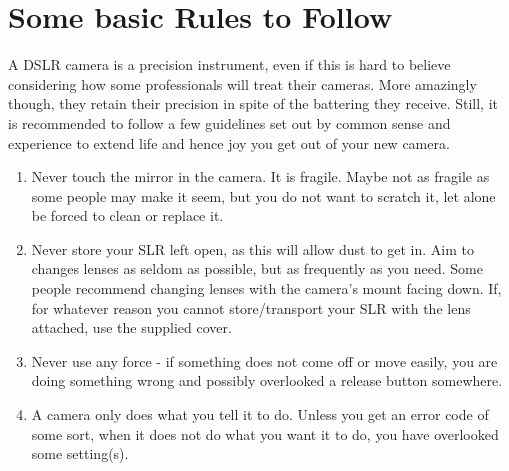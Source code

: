 \section{Some basic Rules to Follow}

A \gls{DSLR} camera is a precision instrument, even if this is hard to believe considering how some professionals will treat their cameras. More amazingly though, they retain their precision in spite of the battering they receive. Still, it is recommended to follow a few guidelines set out by common sense and experience to extend life and hence joy you get out of your new camera.

\begin{enumerate}[i]
	\item Never touch the mirror in the camera. It is fragile. Maybe not as fragile as some people may make it seem, but you do not want to scratch it, let alone be forced to clean or replace it.
	
	\item Never store your \gls{SLR} left open, as this will allow dust to get in. Aim to changes lenses as seldom as possible, but as frequently as you need. Some people recommend changing lenses with the camera's mount facing down. If, for whatever reason you cannot store/transport your \gls{SLR} with the lens attached, use the supplied cover.
	
	\item Never use any force - if something does not come off or move easily, you are doing something wrong and possibly overlooked a release button somewhere.
	
	\item A camera only does what you tell it to do. Unless you get an error code of some sort, when it does not do what you want it to do, you have overlooked some setting(s).
\end{enumerate}